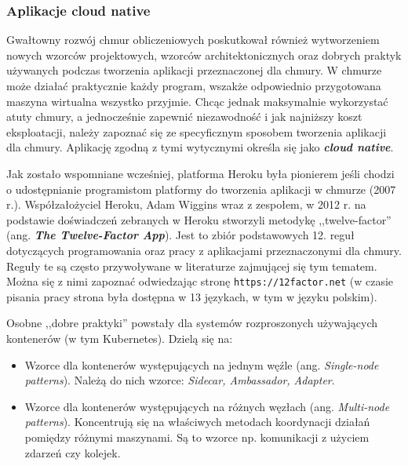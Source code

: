 \documentclass[12pt,a4paper,twoside,titlepage,openright]{book}
\begin{document}
\subsubsection*{Aplikacje cloud native}

Gwałtowny rozwój chmur obliczeniowych poskutkował również wytworzeniem nowych wzorców projektowych, wzorców architektonicznych oraz dobrych praktyk używanych podczas tworzenia aplikacji przeznaczonej dla chmury. W chmurze może działać praktycznie każdy program, wszakże odpowiednio przygotowana maszyna wirtualna wszystko przyjmie. Chcąc jednak maksymalnie wykorzystać atuty chmury, a jednocześnie zapewnić niezawodność i jak najniższy koszt eksploatacji, należy zapoznać się ze specyficznym sposobem tworzenia aplikacji dla chmury. Aplikację zgodną z tymi wytycznymi określa się jako \textbf{\textit{cloud native}}.

Jak zostało wspomniane wcześniej, platforma Heroku była pionierem jeśli chodzi o udostępnianie programistom platformy do tworzenia aplikacji w chmurze (2007 r.). Współzałożyciel Heroku, Adam Wiggins wraz z zespołem, w 2012 r. na podstawie doświadczeń zebranych w Heroku stworzyli metodykę ,,twelve-factor'' (ang. \textbf{\textit{The Twelve-Factor App}}). Jest to zbiór podstawowych 12. reguł dotyczących programowania oraz pracy z aplikacjami przeznaczonymi dla chmury. Reguły te są często przywoływane w literaturze zajmującej się tym tematem.\cite{cloudFoundry, microservicesPacktNetCore} Można się z nimi zapoznać odwiedzając stronę \texttt{https://12factor.net} (w czasie pisania pracy strona była dostępna w 13 językach, w tym w języku polskim).

Osobne ,,dobre praktyki'' powstały dla systemów rozproszonych używających kontenerów (w tym Kubernetes). Dzielą się na:
\begin{itemize}
\item Wzorce dla kontenerów występujących na jednym węźle (ang. \textit{Single-node patterns}). Należą do nich wzorce: \textit{Sidecar, Ambassador, Adapter}.
\item Wzorce dla kontenerów występujących na różnych węzłach (ang. \textit{Multi-node patterns}). Koncentrują się na właściwych metodach koordynacji działań pomiędzy różnymi maszynami. Są to wzorce np. komunikacji z użyciem zdarzeń czy kolejek.  \cite{kubernetesPacktMastering, distributedSystems}
\end{itemize}
\end{document}
